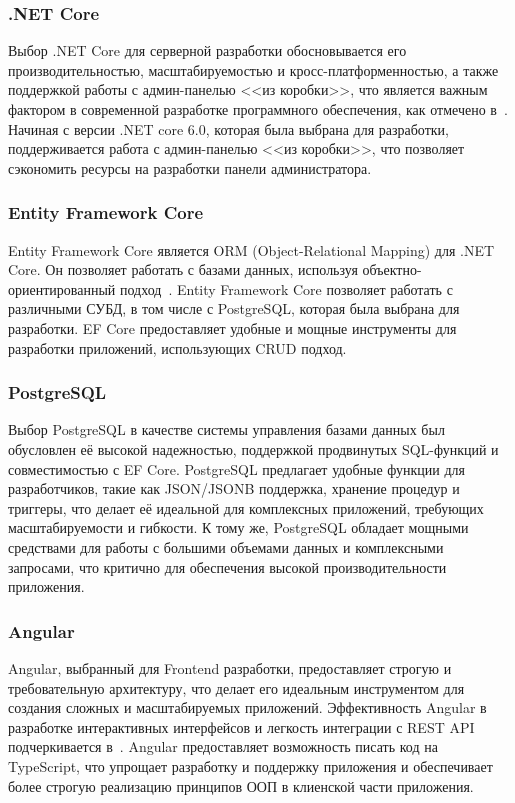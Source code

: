 \subsubsection{.NET Core}
Выбор .NET Core для серверной разработки обосновывается его производительностью, масштабируемостью и кросс-платформенностью, а также поддержкой работы с админ-панелью <<из коробки>>, что является важным фактором в современной разработке программного обеспечения, как отмечено в~\cite{mark_price}.
Начиная с версии .NET core 6.0, которая была выбрана для разработки, поддерживается работа с админ-панелью <<из коробки>>, что позволяет сэкономить ресурсы на разработки панели администратора.

\subsubsection{Entity Framework Core}
Entity Framework Core является ORM (Object-Relational Mapping) для .NET Core. Он позволяет работать с базами данных, используя объектно-ориентированный подход~\cite{grinchenko}. Entity Framework Core позволяет работать с различными СУБД, в том числе с PostgreSQL, которая была выбрана для разработки. EF Core предоставляет удобные и мощные инструменты для разработки приложений, использующих CRUD подход.

\subsubsection{PostgreSQL}
Выбор PostgreSQL в качестве системы управления базами данных был обусловлен её высокой надежностью, поддержкой продвинутых SQL-функций и совместимостью с EF Core. PostgreSQL предлагает удобные функции для разработчиков, такие как JSON/JSONB поддержка, хранение процедур и триггеры, что делает её идеальной для комплексных приложений, требующих масштабируемости и гибкости. К тому же, PostgreSQL обладает мощными средствами для работы с большими объемами данных и комплексными запросами, что критично для обеспечения высокой производительности приложения.

\subsubsection{Angular}
Angular, выбранный для Frontend разработки, предоставляет строгую и требовательную архитектуру, что делает его идеальным инструментом для создания сложных и масштабируемых приложений. Эффективность Angular в разработке интерактивных интерфейсов и легкость интеграции с REST API подчеркивается в~\cite{cssspecs}. Angular предоставляет возможность писать код на TypeScript, что упрощает разработку и поддержку приложения и обеспечивает более строгую реализацию принципов ООП в клиенской части приложения.

